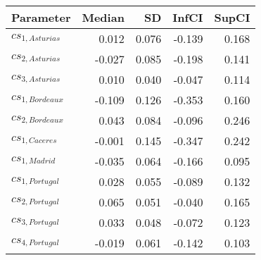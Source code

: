 \begin{table}[ht]
\centering
\begin{tabular}{lrrrr}
  \hline
Parameter & Median & SD & InfCI & SupCI \\ 
  \hline
$cs_{1,Asturias}$ & 0.012 & 0.076 & -0.139 & 0.168 \\ 
  $cs_{2,Asturias}$ & -0.027 & 0.085 & -0.198 & 0.141 \\ 
  $cs_{3,Asturias}$ & 0.010 & 0.040 & -0.047 & 0.114 \\ 
  $cs_{1,Bordeaux}$ & -0.109 & 0.126 & -0.353 & 0.160 \\ 
  $cs_{2,Bordeaux}$ & 0.043 & 0.084 & -0.096 & 0.246 \\ 
  $cs_{1,Caceres}$ & -0.001 & 0.145 & -0.347 & 0.242 \\ 
  $cs_{1,Madrid}$ & -0.035 & 0.064 & -0.166 & 0.095 \\ 
  $cs_{1,Portugal}$ & 0.028 & 0.055 & -0.089 & 0.132 \\ 
  $cs_{2,Portugal}$ & 0.065 & 0.051 & -0.040 & 0.165 \\ 
  $cs_{3,Portugal}$ & 0.033 & 0.048 & -0.072 & 0.123 \\ 
  $cs_{4,Portugal}$ & -0.019 & 0.061 & -0.142 & 0.103 \\ 
   \hline
\end{tabular}
\end{table}
